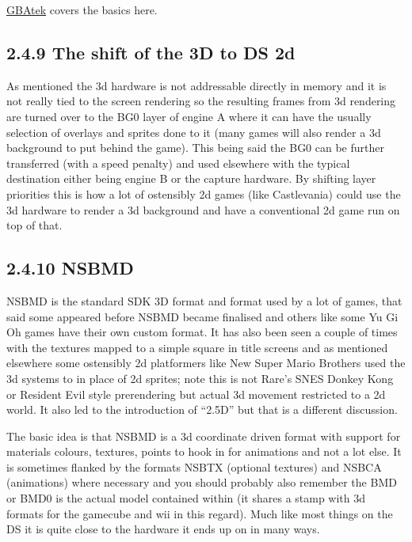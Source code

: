 \documentclass[
]{book}
\begin{document}
\href{http://problemkaputt.de/gbatek.htm\#ds3dmatrixloadmultiply}{GBAtek} covers the basics here.

\hypertarget{the-shift-of-the-3d-to-ds-2d}{%
\subsection{2.4.9 The shift of the 3D to DS 2d}\label{the-shift-of-the-3d-to-ds-2d}}

As mentioned the 3d hardware is not addressable directly in memory and it is not really tied to the screen rendering so the resulting frames from 3d rendering are turned over to the BG0 layer of engine A where it can have the usually selection of overlays and sprites done to it (many games will also render a 3d background to put behind the game). This being said the BG0 can be further transferred (with a speed penalty) and used elsewhere with the typical destination either being engine B or the capture hardware. By shifting layer priorities this is how a lot of ostensibly 2d games (like Castlevania) could use the 3d hardware to render a 3d background and have a conventional 2d game run on top of that.

\hypertarget{nsbmd}{%
\subsection{2.4.10 NSBMD}\label{nsbmd}}

NSBMD is the standard SDK 3D format and format used by a lot of games, that said some appeared before NSBMD became finalised and others like some Yu Gi Oh games have their own custom format. It has also been seen a couple of times with the textures mapped to a simple square in title screens and as mentioned elsewhere some ostensibly 2d platformers like New Super Mario Brothers used the 3d systems to in place of 2d sprites; note this is not Rare's SNES Donkey Kong or Resident Evil style prerendering but actual 3d movement restricted to a 2d world. It also led to the introduction of ``2.5D'' but that is a different discussion.

The basic idea is that NSBMD is a 3d coordinate driven format with support for materials colours, textures, points to hook in for animations and not a lot else. It is sometimes flanked by the formats NSBTX (optional textures) and NSBCA (animations) where necessary and you should probably also remember the BMD or BMD0 is the actual model contained within (it shares a stamp with 3d formats for the gamecube and wii in this regard). Much like most things on the DS it is quite close to the hardware it ends up on in many ways.
\end{document}
